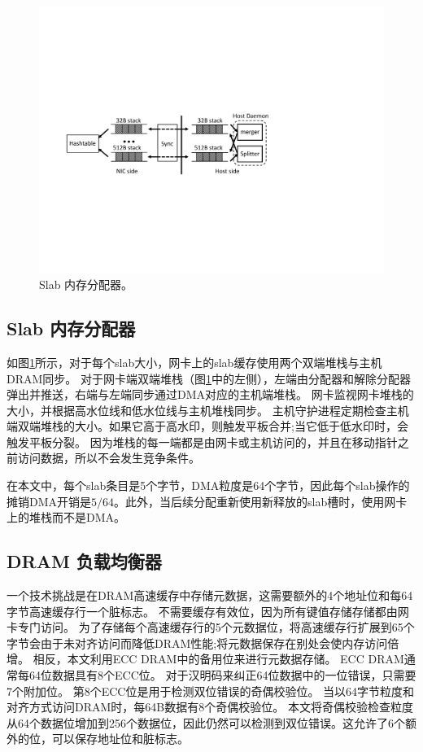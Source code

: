 \begin{figure}[t]
\centering
\includegraphics[width=.8\textwidth,page=1]{figure/cropped_slab.pdf}
\caption{Slab 内存分配器。}
\label{kvdirect:fig:slab}

\end{figure}

\subsection{Slab 内存分配器}
如图\ref {kvdirect:fig:slab}所示，对于每个slab大小，网卡上的slab缓存使用两个双端堆栈与主机DRAM同步。
对于网卡端双端堆栈（图\ref {kvdirect:fig:slab}中的左侧），左端由分配器和解除分配器弹出并推送，右端与左端同步通过DMA对应的​​主机端堆栈。
网卡监视网卡堆栈的大小，并根据高水位线和低水位线与主机堆栈同步。
主机守护进程定期检查主机端双端堆栈的大小。如果它高于高水印，则触发平板合并;当它低于低水印时，会触发平板分裂。
因为堆栈的每一端都是由网卡或主机访问的，并且在移动指针之前访问数据，所以不会发生竞争条件。

在本文中，每个slab条目是5个字节，DMA粒度是64个字节，因此每个slab操作的摊销DMA开销是$ 5/64 $。此外，当后续分配重新使用新释放的slab槽时，使用网卡上的堆栈而不是DMA。


\subsection{DRAM 负载均衡器}

一个技术挑战是在DRAM高速缓存中存储元数据，这需要额外的4个地址位和每64字节高速缓存行一个脏标志。
不需要缓存有效位，因为所有键值存储存储都由网卡专门访问。
为了存储每个高速缓存行的5个元数据位，将高速缓存行扩展到65个字节会由于未对齐访问而降低DRAM性能;将元数据保存在别处会使内存访问倍增。
相反，本文利用ECC DRAM中的备用位来进行元数据存储。
ECC DRAM通常每64位数据具有8个ECC位。
对于汉明码来纠正64位数据中的一位错误，只需要7个附加位。
第8个ECC位是用于检测双位错误的奇偶校验位。
当以64字节粒度和对齐方式访问DRAM时，每64B数据有8个奇偶校验位。
本文将奇偶校验检查粒度从64个数据位增加到256个数据位，因此仍然可以检测到双位错误。这允许了6个额外的位，可以保存地址位和脏标志。

